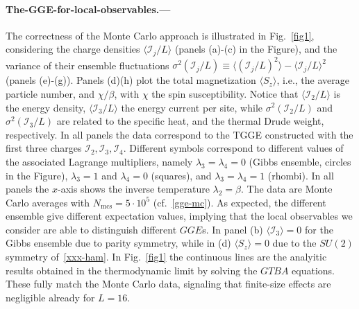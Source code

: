 \documentclass[twocolumn,superscriptaddress,prb,10pt]{revtex4-1}
\begin{document}
\paragraph*{The-GGE-for-local-observables.---} 

The correctness of the Monte Carlo approach is illustrated in Fig.~\ref{fig1}, considering 
the charge densities $\langle {\mathcal I}_j/L\rangle$ (panels (a)-(c) in the Figure), 
and the variance of their ensemble fluctuations $\sigma^2({\mathcal I}_j/L)\equiv
\langle({\mathcal I}_j/L)^2\rangle-\langle{\mathcal I}_j/L\rangle^2$ (panels (e)-(g)). 
Panels (d)(h) plot the total magnetization $\langle S_z\rangle$, i.e., the average 
particle number, and $\chi/\beta$, with $\chi$ the spin susceptibility. 
Notice that $\langle{\mathcal I}_2/L\rangle$ is the energy density, 
$\langle{\mathcal I}_3/L\rangle$ the energy current per site, while $\sigma^2({\mathcal I}_2/L)$ 
and $\sigma^2({\mathcal I}_3/L)$ are related to the specific heat, and the thermal Drude 
weight, respectively. In all panels the data correspond to the TGGE constructed with 
the first three charges ${\mathcal I}_2,{\mathcal I}_3,{\mathcal I}_4$. Different symbols 
correspond to different values of the associated Lagrange multipliers, namely 
$\lambda_3=\lambda_4=0$ (Gibbs ensemble, circles in the Figure), $\lambda_3=1$ and 
$\lambda_4=0$ (squares), and $\lambda_3=\lambda_4=1$ (rhombi). 
In all panels the $x$-axis shows the inverse temperature $\lambda_2=\beta$. The data 
are Monte Carlo averages with $N_{\textrm{mcs}}=5\cdot 10^5$ (cf.~\eqref{gge-mc}). 
As expected, the different ensemble give different expectation values, implying that 
the local observables we consider are able to distinguish different $GGE$s. In panel 
(b) $\langle {\mathcal I}_3\rangle=0$ for the Gibbs ensemble due to parity 
symmetry, while in (d) $\langle S_z\rangle=0$ due to the $SU(2)$ symmetry of~\eqref{xxx-ham}. 
In Fig.~\ref{fig1} the continuous lines are the analyitic results obtained 
in the thermodynamic limit by solving the $GTBA$ equations. These fully match the Monte 
Carlo data, signaling  that finite-size effects are negligible already for $L=16$.  
\end{document}
